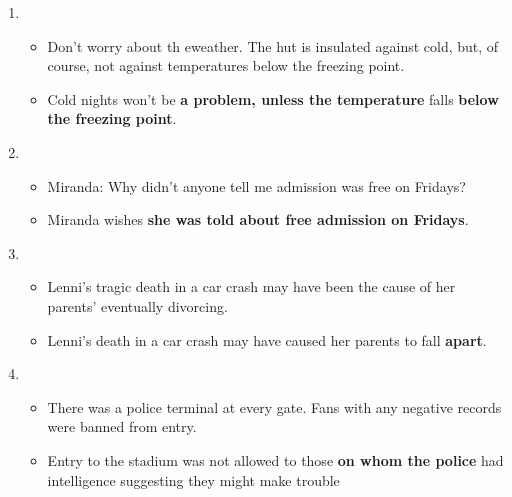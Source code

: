 \documentclass[a4paper]{article}
\begin{document}
\begin{enumerate}
    \item \begin{itemize}
        \item Don't worry about th eweather. The hut is insulated against cold, but, of course, not against temperatures below the freezing point.
        \item Cold nights won't be {\bf a problem, unless the temperature} falls {\bf below the freezing point}.
    \end{itemize}
    \item \begin{itemize}
        \item Miranda: Why didn't anyone tell me admission was free on Fridays?
        \item Miranda wishes {\bf she was told about free admission on Fridays}.
    \end{itemize}
    \item \begin{itemize}
        \item Lenni's tragic death in a car crash may have been the cause of her parents' eventually divorcing.
        \item Lenni's death in a car crash may have caused her parents to fall {\bf apart}.
    \end{itemize}
    \pagebreak
    \item \begin{itemize}
        \item There was a police terminal at every gate. Fans with any negative records were banned from entry.
        \item Entry to the stadium was not allowed to those {\bf on whom the police} had intelligence suggesting they might make trouble
    \end{itemize}

\end{enumerate}
\end{document}
